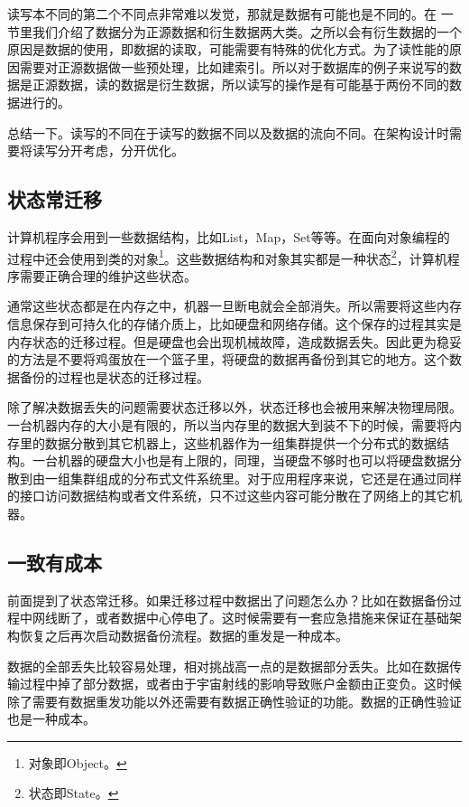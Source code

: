 读写本不同的第二个不同点非常难以发觉，那就是数据有可能也是不同的。在 一节里我们介绍了数据分为正源数据和衍生数据两大类。之所以会有衍生数据的一个原因是数据的使用，即数据的读取，可能需要有特殊的优化方式。为了读性能的原因需要对正源数据做一些预处理，比如建索引。所以对于数据库的例子来说写的数据是正源数据，读的数据是衍生数据，所以读写的操作是有可能基于两份不同的数据进行的。


总结一下。读写的不同在于读写的数据不同以及数据的流向不同。在架构设计时需要将读写分开考虑，分开优化。



\subsection{状态常迁移}

计算机程序会用到一些数据结构，比如List，Map，Set等等。在面向对象编程的过程中还会使用到类的对象\footnote{对象即Object。}。这些数据结构和对象其实都是一种状态\footnote{状态即State。}，计算机程序需要正确合理的维护这些状态。

通常这些状态都是在内存之中，机器一旦断电就会全部消失。所以需要将这些内存信息保存到可持久化的存储介质上，比如硬盘和网络存储。这个保存的过程其实是内存状态的迁移过程。但是硬盘也会出现机械故障，造成数据丢失。因此更为稳妥的方法是不要将鸡蛋放在一个篮子里，将硬盘的数据再备份到其它的地方。这个数据备份的过程也是状态的迁移过程。

除了解决数据丢失的问题需要状态迁移以外，状态迁移也会被用来解决物理局限。一台机器内存的大小是有限的，所以当内存里的数据大到装不下的时候，需要将内存里的数据分散到其它机器上，这些机器作为一组集群提供一个分布式的数据结构。一台机器的硬盘大小也是有上限的，同理，当硬盘不够时也可以将硬盘数据分散到由一组集群组成的分布式文件系统里。对于应用程序来说，它还是在通过同样的接口访问数据结构或者文件系统，只不过这些内容可能分散在了网络上的其它机器。



\subsection{一致有成本}

前面提到了状态常迁移。如果迁移过程中数据出了问题怎么办？比如在数据备份过程中网线断了，或者数据中心停电了。这时候需要有一套应急措施来保证在基础架构恢复之后再次启动数据备份流程。数据的重发是一种成本。

数据的全部丢失比较容易处理，相对挑战高一点的是数据部分丢失。比如在数据传输过程中掉了部分数据，或者由于宇宙射线的影响导致账户金额由正变负。这时候除了需要有数据重发功能以外还需要有数据正确性验证的功能。数据的正确性验证也是一种成本。


